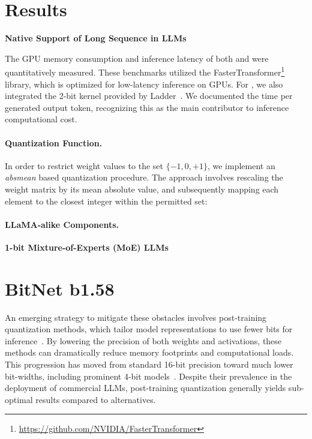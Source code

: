 \section{Results}

\textbf{Native Support of Long Sequence in LLMs}

The GPU memory consumption and inference latency of both  and  were quantitatively measured. These benchmarks utilized the FasterTransformer\footnote{\url{https://github.com/NVIDIA/FasterTransformer}} library, which is optimized for low-latency inference on GPUs. For , we also integrated the 2-bit kernel provided by Ladder~\cite{ladder}. We documented the time per generated output token, recognizing this as the main contributor to inference computational cost.

\paragraph{Quantization Function.} In order to restrict weight values to the set $\{-1, 0, +1\}$, we implement an \emph{absmean} based quantization procedure. The approach involves rescaling the weight matrix by its mean absolute value, and subsequently mapping each element to the closest integer within the permitted set:

\paragraph{LLaMA-alike Components.}

\textbf{1-bit Mixture-of-Experts (MoE) LLMs}

\section{BitNet b1.58}

An emerging strategy to mitigate these obstacles involves post-training quantization methods, which tailor model representations to use fewer bits for inference~\cite{smoothquant, gptq, quip, quip_sharp}. By lowering the precision of both weights and activations, these methods can dramatically reduce memory footprints and computational loads. This progression has moved from standard 16-bit precision toward much lower bit-widths, including prominent 4-bit models~\cite{gptq, awq}. Despite their prevalence in the deployment of commercial LLMs, post-training quantization generally yields sub-optimal results compared to alternatives.

